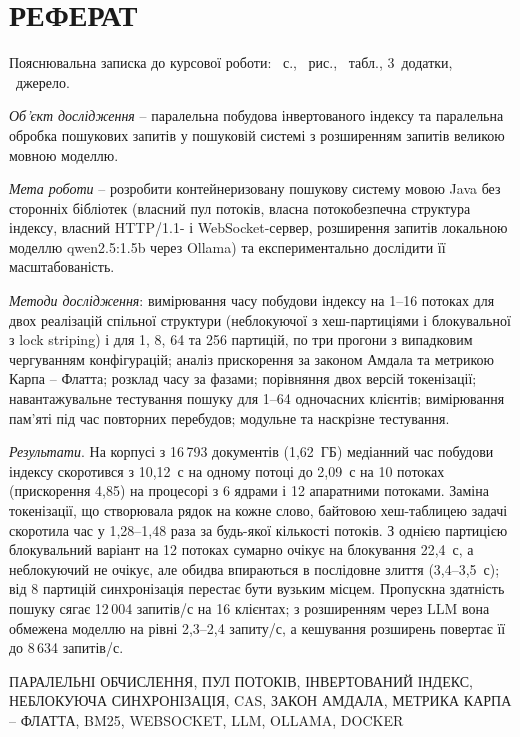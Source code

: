 \section*{РЕФЕРАТ}

Пояснювальна записка до курсової роботи: \pageref{LastPage}~с., ~рис.,
~табл., 3~додатки, ~джерело.

\textit{Об'єкт дослідження} -- паралельна побудова інвертованого індексу та паралельна обробка
пошукових запитів у пошуковій системі з розширенням запитів великою мовною моделлю.

\textit{Мета роботи} -- розробити контейнеризовану пошукову систему мовою Java без сторонніх
бібліотек (власний пул потоків, власна потокобезпечна структура індексу, власний HTTP/1.1- і
WebSocket-сервер, розширення запитів локальною моделлю qwen2.5:1.5b через Ollama) та
експериментально дослідити її масштабованість.

\textit{Методи дослідження}: вимірювання часу побудови індексу на 1--16 потоках для двох
реалізацій спільної структури (неблокуючої з хеш-партиціями і блокувальної з lock striping) і
для 1, 8, 64 та 256 партицій, по три прогони з випадковим чергуванням конфігурацій; аналіз
прискорення за законом Амдала та метрикою Карпа -- Флатта; розклад часу за фазами;
порівняння двох версій токенізації; навантажувальне тестування пошуку для 1--64 одночасних
клієнтів; вимірювання пам'яті під час повторних перебудов; модульне та наскрізне тестування.

\textit{Результати}. На корпусі з 16\,793 документів (1,62~ГБ) медіанний час побудови індексу
скоротився з 10,12~с на одному потоці до 2,09~с на 10 потоках (прискорення 4,85) на
процесорі з 6 ядрами і 12 апаратними потоками. Заміна токенізації, що створювала рядок на
кожне слово, байтовою хеш-таблицею задачі скоротила час у 1,28--1,48 раза за будь-якої
кількості потоків. З однією партицією блокувальний варіант на 12 потоках сумарно очікує на
блокування 22,4~с, а неблокуючий не очікує, але обидва впираються в послідовне злиття
(3,4--3,5~с); від 8 партицій синхронізація перестає бути вузьким місцем. Пропускна здатність
пошуку сягає 12\,004 запитів/с на 16 клієнтах; з розширенням через LLM вона обмежена моделлю
на рівні 2,3--2,4 запиту/с, а кешування розширень повертає її до 8\,634 запитів/с.

\bigskip
\noindent ПАРАЛЕЛЬНІ ОБЧИСЛЕННЯ, ПУЛ ПОТОКІВ, ІНВЕРТОВАНИЙ ІНДЕКС, НЕБЛОКУЮЧА СИНХРОНІЗАЦІЯ,
CAS, ЗАКОН АМДАЛА, МЕТРИКА КАРПА -- ФЛАТТА, BM25, WEBSOCKET, LLM, OLLAMA, DOCKER

\clearpage
